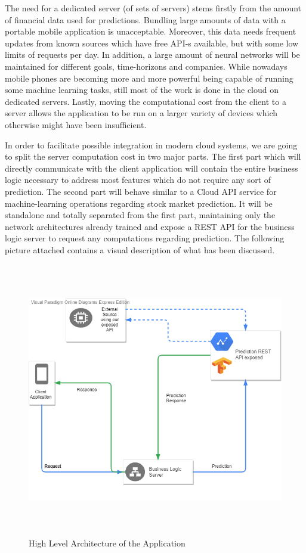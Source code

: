 The need for a dedicated server (of sets of servers) stems firstly from the amount of financial data used for predictions. Bundling large amounts of data with a portable mobile application is unacceptable. Moreover, this data needs frequent updates from known sources which have free API-s available, but with some low limits of requests per day. In addition, a large amount of neural networks will be maintained for different goals, time-horizons and companies. While nowadays mobile phones are becoming more and more powerful being capable of running some machine learning tasks, still most of the work is done in the cloud on dedicated servers. Lastly, moving the computational cost from the client to a server allows the application to be run on a larger variety of devices which otherwise might have been insufficient.

In order to facilitate possible integration in modern cloud systems, we are going to split the server computation cost in two major parts. The first part which will directly communicate with the client application will contain the entire business logic necessary to address most features which do not require any sort of prediction. The second part will behave similar to a Cloud API service for machine-learning operations regarding stock market prediction. It will be standalone and totally separated from the first part, maintaining only the network architectures already trained and expose a REST API for the business logic server to request any computations regarding prediction. The following picture attached contains a visual description of what has been discussed.

\begin{figure}[H]
\centering
\includegraphics[height=12cm]{images/HighLevelArchitecture.png} 
\caption{High Level Architecture of the Application}
\label{fig:highlevelarchitecture}
\end{figure}


